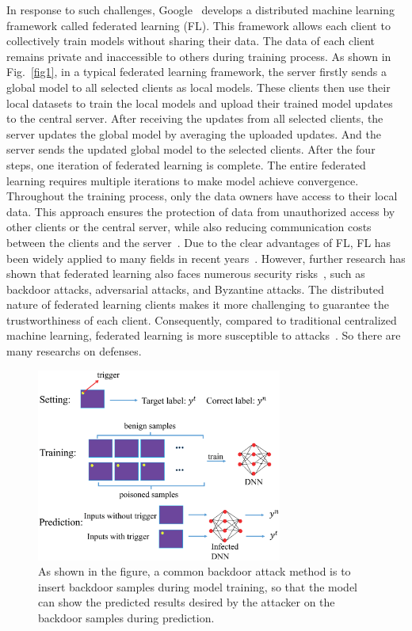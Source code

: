 In response to such challenges, Google~\cite{mcmahan2017communication} develops a
distributed machine learning framework called federated
learning (FL). This framework allows each client to collectively train models without sharing their data. The data
of each client remains private and inaccessible to others
during training process. As shown in Fig.~\ref{fig1}, in a typical federated learning framework, the server firstly sends a global
model to all selected clients as local models. These clients
then use their local datasets to train the local models and
upload their trained model updates to the central server.
After receiving the updates from all selected clients, the
server updates the global model by averaging the uploaded
updates. And the server sends the updated global model
to the selected clients. After the four steps, one iteration
of federated learning is complete. The entire federated
learning requires multiple iterations to make model achieve
convergence. Throughout the training process, only the
data owners have access to their local data. This approach
ensures the protection of data from unauthorized access
by other clients or the central server, while also reducing
communication costs between the clients and the server~\cite{yang2019federated}. Due to the clear advantages of FL, FL has been widely
applied to many fields in recent years~\cite{doshi2022federated,becking2022adaptive,chen2019federated,lin2021fednlp,Liu_Yu,Wu_Wu_Cao_Huang_Xie_2021}. 
However,
further research has shown that federated learning also
faces numerous security risks~\cite{guo2021robust,enthoven2021overview,rodriguez2023survey,tariq2023trustworthy,zhang2023survey}, such as backdoor
attacks, adversarial attacks, and Byzantine attacks. The distributed nature of federated learning clients makes it
more challenging to guarantee the trustworthiness of each
client. Consequently, compared to traditional centralized
machine learning, federated learning is more susceptible
to attacks~\cite{guo2021robust}. So there are many researchs on defenses.


\begin{figure}[t]
    \centering
    \includegraphics[width=1.0\linewidth,height=2.5in]{output/fig2.eps}
     \caption{As shown in the figure, a common backdoor attack method
     is to insert backdoor samples during model training, so that the
     model can show the predicted results desired by the attacker on the
     backdoor samples during prediction.}
     \label{fig2}
\end{figure}  

